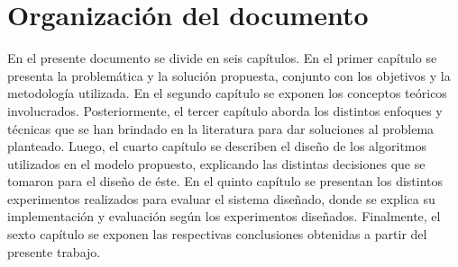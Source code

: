 \section{Organización del documento}
\label{intro:organizacion}
En el presente documento se divide en seis capítulos. En el primer capítulo se presenta la problemática y la solución propuesta, conjunto con los objetivos y la metodología utilizada. En el segundo capítulo se exponen los conceptos teóricos involucrados. Posteriormente, el tercer capítulo aborda los distintos enfoques y técnicas que se han brindado en la literatura para dar soluciones al problema planteado. Luego, el cuarto capítulo se describen el diseño de los algoritmos utilizados en el modelo propuesto, explicando las distintas decisiones que se tomaron para el diseño de éste. En el quinto capítulo se presentan los distintos experimentos realizados para evaluar el sistema diseñado, donde se explica su implementación y evaluación según los experimentos diseñados. Finalmente, el sexto capítulo se exponen las respectivas conclusiones obtenidas a partir del presente trabajo.